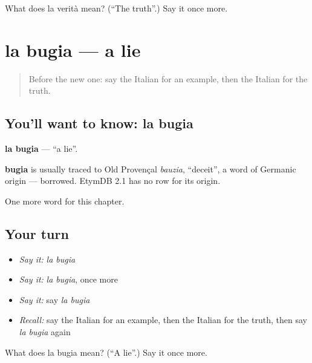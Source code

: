 \begin{tcolorbox}[breakable,colback=teal!4,colframe=teal!35!black,title={Before you move on}]
What does la verità mean? (\textquotedblleft{}The truth\textquotedblright{}.) Say it once more.
\end{tcolorbox}
\section[la bugia]{la bugia — a lie}

\label{lesson:IT-C252-bugia}



\begin{quote}
Before the new one: say the Italian for an example, then the Italian for the truth.
\end{quote}

\subsection*{You'll want to know: la bugia}
\textbf{la bugia} — \textquotedblleft{}a lie\textquotedblright{}.

\begin{cousinweb}
\textbf{bugia} is usually traced to Old Provençal \emph{bauzia}, \textquotedblleft{}deceit\textquotedblright{}, a word of Germanic origin — borrowed. EtymDB 2.1 has no row for its origin.
\end{cousinweb}

\begin{grammarlens}[title={What you've built}]
One more word for this chapter.
\end{grammarlens}

\subsection*{Your turn}
\begin{itemize}
\raggedright
  \item \emph{Say it:} \emph{la bugia}
  \item \emph{Say it:} \emph{la bugia}, once more
  \item \emph{Say it:} say \emph{la bugia}
  \item \emph{Recall:} say the Italian for an example, then the Italian for the truth, then say \emph{la bugia} again
\end{itemize}

\begin{tcolorbox}[breakable,colback=teal!4,colframe=teal!35!black,title={Before you move on}]
What does la bugia mean? (\textquotedblleft{}A lie\textquotedblright{}.) Say it once more.
\end{tcolorbox}
